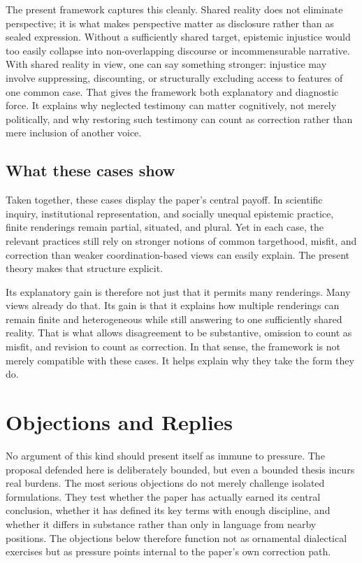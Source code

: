 \documentclass[11pt]{article}
\begin{document}
The present framework captures this cleanly. Shared reality does not eliminate perspective; it is what makes perspective matter as disclosure rather than as sealed expression. Without a sufficiently shared target, epistemic injustice would too easily collapse into non-overlapping discourse or incommensurable narrative. With shared reality in view, one can say something stronger: injustice may involve suppressing, discounting, or structurally excluding access to features of one common case. That gives the framework both explanatory and diagnostic force. It explains why neglected testimony can matter cognitively, not merely politically, and why restoring such testimony can count as correction rather than mere inclusion of another voice.

\subsection{What these cases show}

Taken together, these cases display the paper's central payoff. In scientific inquiry, institutional representation, and socially unequal epistemic practice, finite renderings remain partial, situated, and plural. Yet in each case, the relevant practices still rely on stronger notions of common targethood, misfit, and correction than weaker coordination-based views can easily explain. The present theory makes that structure explicit.

Its explanatory gain is therefore not just that it permits many renderings. Many views already do that. Its gain is that it explains how multiple renderings can remain finite and heterogeneous while still answering to one sufficiently shared reality. That is what allows disagreement to be substantive, omission to count as misfit, and revision to count as correction. In that sense, the framework is not merely compatible with these cases. It helps explain why they take the form they do.
\section{Objections and Replies}

No argument of this kind should present itself as immune to pressure. The proposal defended here is deliberately bounded, but even a bounded thesis incurs real burdens. The most serious objections do not merely challenge isolated formulations. They test whether the paper has actually earned its central conclusion, whether it has defined its key terms with enough discipline, and whether it differs in substance rather than only in language from nearby positions. The objections below therefore function not as ornamental dialectical exercises but as pressure points internal to the paper's own correction path.
\end{document}
